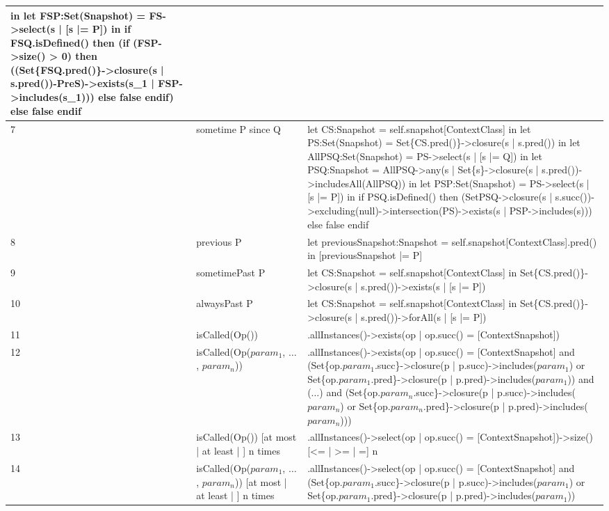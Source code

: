 \begin{longtable}{|>{\footnotesize}p{0.6cm}|>{\scriptsize\raggedright\arraybackslash}p{4cm}|>{\scriptsize\raggedright\arraybackslash}p{\dimexpr\textwidth-4.6cm-4\tabcolsep-3\arrayrulewidth\relax}|}
    in let FSP:Set(Snapshot) = FS->select(s | [s |= P])
    in if FSQ.isDefined() then (if (FSP->size() > 0) then ((Set\{FSQ.pred()\}->closure(s | s.pred())-PreS)->exists(s\_1 | FSP->includes(s\_1))) else false endif) else false endif \\
    \hline
    7 &
    sometime P since Q &
    let CS:Snapshot = self.snapshot[ContextClass]
    in let PS:Set(Snapshot) = Set\{CS.pred()\}->closure(s | s.pred())
    in let AllPSQ:Set(Snapshot) = PS->select(s | [s |= Q])
    in let PSQ:Snapshot = AllPSQ->any(s | Set\{s\}->closure(s | s.pred())->includesAll(AllPSQ))
    in let PSP:Set(Snapshot) = PS->select(s | [s |= P])
    in if PSQ.isDefined() then (Set{PSQ}->closure(s | s.succ())->excluding(null)->intersection(PS)->exists(s | PSP->includes(s))) else false endif \\ 
    \hline
    8 &
    previous P &
    let previousSnapshot:Snapshot = self.snapshot[ContextClass].pred() in [previousSnapshot |= P] \\
    \hline
    9 &
    sometimePast P &
    let CS:Snapshot = self.snapshot[ContextClass] in Set\{CS.pred()\}->closure(s | s.pred())->exists(s | [s |= P]) \\
    \hline
    10 &
    alwaysPast P &
    let CS:Snapshot = self.snapshot[ContextClass] in Set\{CS.pred()\}->closure(s | s.pred())->forAll(s | [s |= P]) \\
    \hline
    11 &
    isCalled(Op()) &
    [OpClassName].allInstances()->exists(op | op.succ() = [ContextSnapshot]) \\
    \hline
    12 &
    isCalled(Op($param_1$, $\ldots$, $param_n$)) &
    [OpClassName].allInstances()->exists(op | op.succ() = [ContextSnapshot] and
    (Set\{op.$param_1$.succ\}->closure(p | p.succ)->includes($param_1$) or Set\{op.$param_1$.pred\}->closure(p | p.pred)->includes($param_1$))
    and ($\ldots$)
    and (Set\{op.$param_n$.succ\}->closure(p | p.succ)->includes($param_n$) or Set\{op.$param_n$.pred\}->closure(p | p.pred)->includes($param_n$))) \\
    \hline
    13 &
    isCalled(Op()) [at most | at least | ] n times &
    [OpClassName].allInstances()->select(op | op.succ() = [ContextSnapshot])->size() [<= | >= | =] n \\
    \hline
    14 &
    isCalled(Op($param_1$, $\ldots$, $param_n$)) [at most | at least | ] n times &
    [OpClassName].allInstances()->select(op | op.succ() = [ContextSnapshot] and
    (Set\{op.$param_1$.succ\}->closure(p | p.succ)->includes($param_1$) or Set\{op.$param_1$.pred\}->closure(p | p.pred)->includes($param_1$)) 

\end{longtable}
